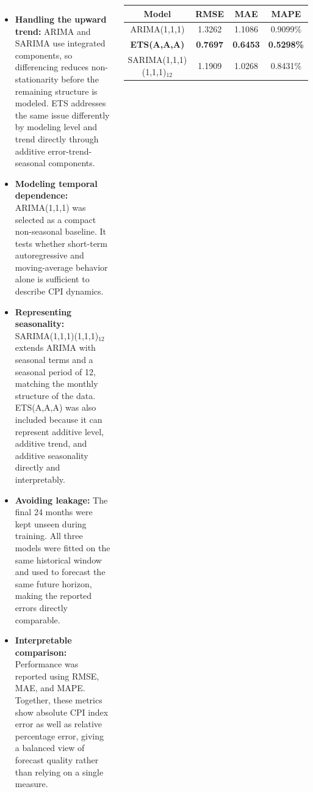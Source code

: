 \documentclass[25pt,a0paper,portrait]{tikzposter}
\begin{document}
\begin{columns}
{{		\begin{itemize}
			\item \textbf{Handling the upward trend:} ARIMA and SARIMA use integrated components, so differencing reduces non-stationarity before the remaining structure is modeled. ETS addresses the same issue differently by modeling level and trend directly through additive error-trend-seasonal components.

			\item \textbf{Modeling temporal dependence:} ARIMA(1,1,1) was selected as a compact non-seasonal baseline. It tests whether short-term autoregressive and moving-average behavior alone is sufficient to describe CPI dynamics.

			\item \textbf{Representing seasonality:} SARIMA(1,1,1)(1,1,1)$_{12}$ extends ARIMA with seasonal terms and a seasonal period of 12, matching the monthly structure of the data. ETS(A,A,A) was also included because it can represent additive level, additive trend, and additive seasonality directly and interpretably.

			\item \textbf{Avoiding leakage:} The final 24 months were kept unseen during training. All three models were fitted on the same historical window and used to forecast the same future horizon, making the reported errors directly comparable.

			\item \textbf{Interpretable comparison:} Performance was reported using RMSE, MAE, and MAPE. Together, these metrics show absolute CPI index error as well as relative percentage error, giving a balanced view of forecast quality rather than relying on a single measure.
		\end{itemize}

		\vspace{0.6em}
	}

	{
		\vspace{-5pt}
		\begin{center}
		\renewcommand{\arraystretch}{1.18}
		\setlength{\tabcolsep}{60pt}
		\begin{tabular}{|c|c|c|c|}
			\hline
			\textbf{Model} & \textbf{RMSE} & \textbf{MAE} & \textbf{MAPE} \\
			\hline
			ARIMA(1,1,1) & 1.3262 & 1.1086 & 0.9099\% \\
			\textbf{ETS(A,A,A)} & \textbf{0.7697} & \textbf{0.6453} & \textbf{0.5298\%} \\
			SARIMA(1,1,1)(1,1,1)$_{12}$ & 1.1909 & 1.0268 & 0.8431\% \\
			\hline
		\end{tabular}
		\end{center}

}}
\end{columns}
\end{document}
